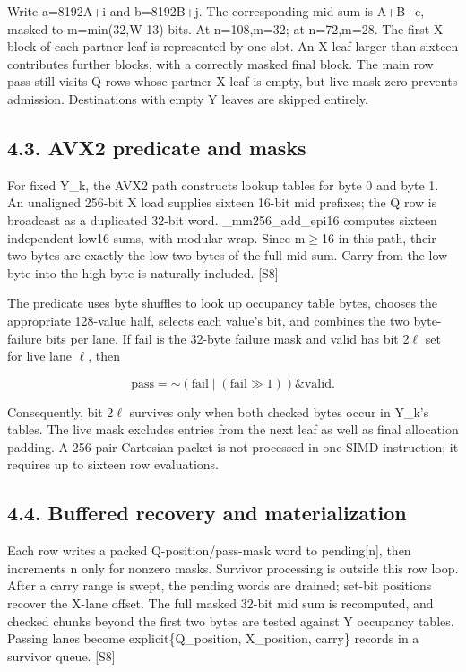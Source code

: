 \documentclass[10pt,letterpaper]{article}
\begin{document}
Write a=8192A+i and b=8192B+j. The corresponding mid sum is A+B+c, masked to m=min(32,W-13) bits. At n=108,m=32; at n=72,m=28. The first X block of each partner leaf is represented by one slot. An X leaf larger than sixteen contributes further blocks, with a correctly masked final block. The main row pass still visits Q rows whose partner X leaf is empty, but live mask zero prevents admission. Destinations with empty Y leaves are skipped entirely.


\subsection*{4.3. AVX2 predicate and masks}

For fixed Y\_k, the AVX2 path constructs lookup tables for byte 0 and byte 1. An unaligned 256-bit X load supplies sixteen 16-bit mid prefixes; the Q row is broadcast as a duplicated 32-bit word. \_mm256\_add\_epi16 computes sixteen independent low16 sums, with modular wrap. Since m\ensuremath{\geq}16 in this path, their two bytes are exactly the low two bytes of the full mid sum. Carry from the low byte into the high byte is naturally included. [S8]


The predicate uses byte shuffles to look up occupancy table bytes, chooses the appropriate 128-value half, selects each value's bit, and combines the two byte-failure bits per lane. If fail is the 32-byte failure mask and valid has bit 2\ensuremath{\ell} set for live lane \ensuremath{\ell}, then


\[
\mathrm{pass}=\mathord{\sim}\left(\mathrm{fail}\mathbin{|}(\mathrm{fail}\mathbin{\gg}1)\right)\mathbin{\&}\mathrm{valid}.
\]

Consequently, bit 2\ensuremath{\ell} survives only when both checked bytes occur in Y\_k's tables. The live mask excludes entries from the next leaf as well as final allocation padding. A 256-pair Cartesian packet is not processed in one SIMD instruction; it requires up to sixteen row evaluations.


\subsection*{4.4. Buffered recovery and materialization}

Each row writes a packed Q-position/pass-mask word to pending[n], then increments n only for nonzero masks. Survivor processing is outside this row loop. After a carry range is swept, the pending words are drained; set-bit positions recover the X-lane offset. The full masked 32-bit mid sum is recomputed, and checked chunks beyond the first two bytes are tested against Y occupancy tables. Passing lanes become explicit\{Q\_position, X\_position, carry\} records in a survivor queue. [S8]
\end{document}

